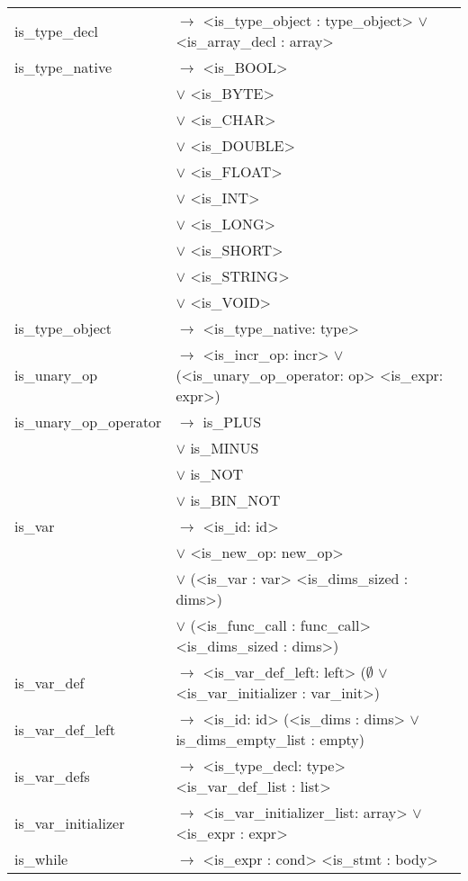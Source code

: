 \documentclass[a4paper]{article}
\begin{document}
\begin{tabular}{ll}
	is\_type\_decl							& $\to$ <is\_type\_object : type\_object> $\vee$ <is\_array\_decl : array> \\
	is\_type\_native						& $\to$ <is\_BOOL> \\
											& $\vee$ <is\_BYTE> \\
											& $\vee$ <is\_CHAR> \\
											& $\vee$ <is\_DOUBLE> \\
											& $\vee$ <is\_FLOAT> \\
											& $\vee$ <is\_INT> \\
											& $\vee$ <is\_LONG> \\
											& $\vee$ <is\_SHORT> \\
											& $\vee$ <is\_STRING> \\
											& $\vee$ <is\_VOID> \\
	is\_type\_object		 				& $\to$ <is\_type\_native: type> \\
	is\_unary\_op			 				& $\to$ <is\_incr\_op: incr> $\vee$ (<is\_unary\_op\_operator: op> <is\_expr: expr>) \\
	is\_unary\_op\_operator					& $\to$ is\_PLUS \\
											& $\vee$ is\_MINUS \\
											& $\vee$ is\_NOT \\
											& $\vee$ is\_BIN\_NOT \\
	is\_var					 				& $\to$ <is\_id: id> \\
											& $\vee$ <is\_new\_op: new\_op> \\
											& $\vee$ (<is\_var : var> <is\_dims\_sized : dims>) \\
											& $\vee$ (<is\_func\_call : func\_call> <is\_dims\_sized : dims>) \\
	is\_var\_def			 				& $\to$ <is\_var\_def\_left: left> ($\emptyset$ $\vee$ <is\_var\_initializer : var\_init>) \\
	is\_var\_def\_left		 				& $\to$ <is\_id: id> (<is\_dims : dims> $\vee$ is\_dims\_empty\_list : empty) \\
	is\_var\_defs		 					& $\to$ <is\_type\_decl: type> <is\_var\_def\_list : list> \\
	is\_var\_initializer 					& $\to$ <is\_var\_initializer\_list: array> $\vee$ <is\_expr : expr> \\
	is\_while 								& $\to$ <is\_expr : cond> <is\_stmt : body> \\
\end{tabular}
\end{document}
